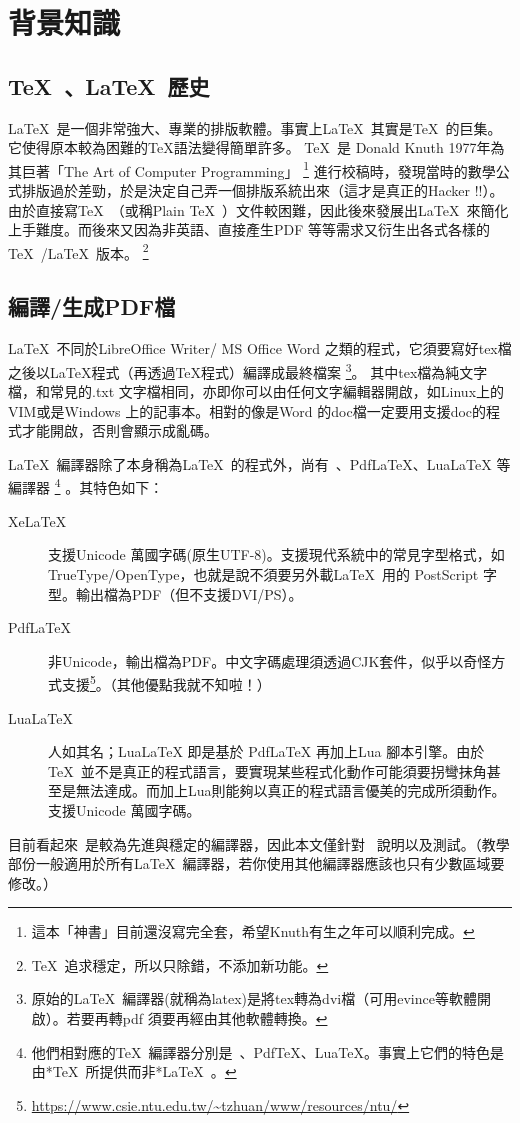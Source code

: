 \documentclass[class=NCU_thesis, crop=false, float=true]{standalone}
\begin{document}
\section{背景知識}

\subsection{\TeX\ 、\LaTeX\ 歷史}
\LaTeX\  是一個非常強大、專業的排版軟體。事實上\LaTeX\ 其實是\TeX\ 的巨集。它使得原本較為困難的TeX語法變得簡單許多。
\TeX\  是 Donald Knuth 1977年為其巨著「The Art of Computer Programming」
\footnote{這本「神書」目前還沒寫完全套，希望Knuth有生之年可以順利完成。}
進行校稿時，發現當時的數學公式排版過於差勁，於是決定自己弄一個排版系統出來（這才是真正的Hacker !!）。由於直接寫\TeX\ （或稱Plain \TeX\ ）文件較困難，因此後來發展出\LaTeX\ 來簡化上手難度。而後來又因為非英語、直接產生PDF 等等需求又衍生出各式各樣的\TeX\ /\LaTeX\ 版本。
\footnote{\TeX\  追求穩定，所以只除錯，不添加新功能。}

\subsection{編譯/生成PDF檔}
\LaTeX\  不同於LibreOffice Writer/ MS Office Word 之類的程式，它須要寫好tex檔之後以LaTeX程式（再透過TeX程式）編譯成最終檔案
\footnote{原始的\LaTeX\ 編譯器(就稱為latex)是將tex轉為dvi檔（可用evince等軟體開啟）。若要再轉pdf 須要再經由其他軟體轉換。}。%
其中tex檔為純文字檔，和常見的.txt 文字檔相同，亦即你可以由任何文字編輯器開啟，如Linux上的VIM或是Windows 上的記事本。相對的像是Word 的doc檔一定要用支援doc的程式才能開啟，否則會顯示成亂碼。

\LaTeX\  編譯器除了本身稱為\LaTeX\ 的程式外，尚有\XeLaTeX\ 、PdfLaTeX、LuaLaTeX 等編譯器
\footnote{他們相對應的\TeX\ 編譯器分別是\XeTeX\ 、PdfTeX、LuaTeX。事實上它們的特色是由*\TeX\  所提供而非*\LaTeX\ 。}
。其特色如下：
\begin{description}
    \item[XeLaTeX]  支援Unicode 萬國字碼(原生UTF-8)。支援現代系統中的常見字型格式，如TrueType/OpenType，也就是說不須要另外載\LaTeX\  用的 PostScript 字型。輸出檔為PDF（但不支援DVI/PS）。
    \item[PdfLaTeX] 非Unicode，輸出檔為PDF。中文字碼處理須透過CJK套件，似乎以奇怪方式支援\footnote{\url{https://www.csie.ntu.edu.tw/~tzhuan/www/resources/ntu/}}。（其他優點我就不知啦！）
    \item[LuaLaTeX] 人如其名；LuaLaTeX 即是基於 PdfLaTeX 再加上Lua 腳本引擎。由於 \TeX\  並不是真正的程式語言，要實現某些程式化動作可能須要拐彎抹角甚至是無法達成。而加上Lua則能夠以真正的程式語言優美的完成所須動作。支援Unicode 萬國字碼。
\end{description}
目前看起來\XeLaTeX\ 是較為先進與穩定的編譯器，因此本文僅針對 \XeLaTeX\  說明以及測試。（教學部份一般適用於所有\LaTeX\  編譯器，若你使用其他編譯器應該也只有少數區域要修改。）
\end{document}
